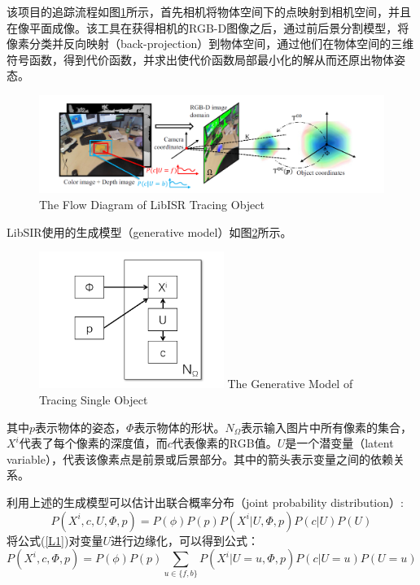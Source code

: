 该项目的追踪流程如图\ref{fig:model}所示，首先相机将物体空间下的点映射到相机空间，并且在像平面成像。该工具在获得相机的RGB-D图像之后，通过前后景分割模型，将像素分类并反向映射（back-projection）到物体空间，通过他们在物体空间的三维符号函数，得到代价函数，并求出使代价函数局部最小化的解从而还原出物体姿态。

\begin{figure}[!htp]
  \centering
  \includegraphics[width=14cm]{figure/model.png}
    {The Flow Diagram of LibISR Tracing Object }
 \label{fig:model}
\end{figure}

LibSIR使用的生成模型（generative model）如图\ref{fig:Gmodel}所示。

\begin{figure}[!htp]
  \centering
  \includegraphics[width=6cm]{figure/jointModel.png}
    {The Generative Model of Tracing Single Object}
 \label{fig:Gmodel}
\end{figure}

其中$p$表示物体的姿态，$\Phi$表示物体的形状。$N_\Omega$表示输入图片中所有像素的集合，$X^i$代表了每个像素的深度值，而$c$代表像素的RGB值。$U$是一个潜变量（latent variable），代表该像素点是前景或后景部分。其中的箭头表示变量之间的依赖关系。

利用上述的生成模型可以估计出联合概率分布（joint probability distribution）:
\begin{equation}
 P(X^i, c, U, \Phi, p) = P(\phi)P(p)P(X^i|U, \Phi, p)P(c|U)P(U)\label{L1}
\end{equation}
将公式(\ref{L1})对变量$U$进行边缘化，可以得到公式：
\begin{equation}
 P(X^i, c, \Phi, p) = P(\phi)P(p)\sum_{u\in\{f,b\}}P(X^i|U=u, \Phi, p)P(c|U=u)P(U=u)\label{L2}
\end{equation}

